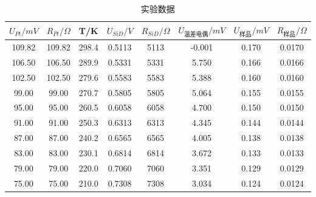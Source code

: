 \documentclass{article}
\begin{document}
    \begin{table}[htbp]
        \centering
        \caption{实验数据}
        \vspace{1ex}
        \begin{tabular}{cccccccc}
            \toprule
            $U_{Pt}/mV$ & $R_{Pt}/\Omega$ & T/K  & $U_{SiD}/V$ & $R_{SiD}/\Omega$ & $U_{\text{温差电偶}}/mV$ & $U_{\text{样品}}/mV$ & $R_{\text{样品}}/\Omega$ \\
            \midrule
            109.82  & 109.82  & 298.4  & 0.5113  & 5113  & -0.001  & 0.170  & 0.0170  \\
            106.50  & 106.50  & 289.9  & 0.5331  & 5331  & 5.750  & 0.166  & 0.0166  \\
            102.50  & 102.50  & 279.6  & 0.5583  & 5583  & 5.388  & 0.160  & 0.0160  \\
            99.00  & 99.00  & 270.7  & 0.5805  & 5805  & 5.064  & 0.155  & 0.0155  \\
            95.00  & 95.00  & 260.5  & 0.6058  & 6058  & 4.700  & 0.150  & 0.0150  \\
            91.00  & 91.00  & 250.3  & 0.6313  & 6313  & 4.345  & 0.144  & 0.0144  \\
            87.00  & 87.00  & 240.2  & 0.6565  & 6565  & 4.005  & 0.138  & 0.0138  \\
            83.00  & 83.00  & 230.1  & 0.6814  & 6814  & 3.672  & 0.133  & 0.0133  \\
            79.00  & 79.00  & 220.0  & 0.7060  & 7060  & 3.351  & 0.129  & 0.0129  \\
            75.00  & 75.00  & 210.0  & 0.7308  & 7308  & 3.034  & 0.124  & 0.0124  \\
            \bottomrule
        \end{tabular}%
    \end{table}%

    \clearpage
\end{document}
